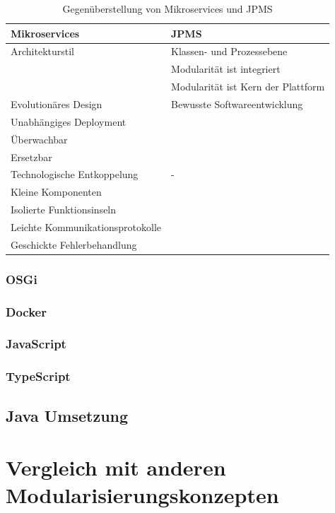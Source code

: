   \begin{table}[h!]
      \label{tab:jpms}
      \begin{tabular}{l|l}
        \textbf{Mikroservices} & \textbf{JPMS}\\
        \hline
        Architekturstil & Klassen- und Prozessebene \\
        & Modularität ist integriert \\
        & Modularität ist Kern der Plattform \\
        \hline
        Evolutionäres Design  & Bewusste Softwareentwicklung \\
        Unabhängiges Deployment &\\
        Überwachbar &\\
        Ersetzbar &\\
        \hline
        Technologische Entkoppelung & - \\
        Kleine Komponenten &\\ 
        Isolierte Funktionsinseln &\\
        Leichte Kommunikationsprotokolle&\\
        Geschickte Fehlerbehandlung&\\

      \end{tabular}
      \caption{Gegenüberstellung von Mikroservices und JPMS}
  \end{table}


\subsubsection{OSGi}


\subsubsection{Docker}
\subsubsection{JavaScript}
\subsubsection{TypeScript}
\subsection{Java Umsetzung} 
\newpage

\section{Vergleich mit anderen Modularisierungskonzepten}


